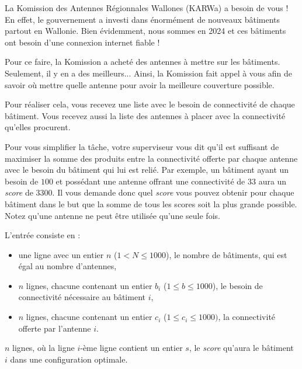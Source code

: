 \problemname{\problemyamlname}


La Komission des Antennes Régionnales Wallones (KARWa) a besoin de vous ! En effet, le gouvernement a investi dans énormément de nouveaux bâtiments partout en Wallonie. Bien évidemment, nous sommes en 2024 et ces bâtiments ont besoin d'une connexion internet fiable !

Pour ce faire, la Komission a acheté des antennes à mettre sur les bâtiments. Seulement, il y en a des meilleurs... Ainsi, la Komission fait appel à vous afin de savoir où mettre quelle antenne pour avoir la meilleure couverture possible.

Pour réaliser cela, vous recevez une liste avec le besoin de connectivité de chaque bâtiment. Vous recevez aussi la liste des antennes à placer avec la connectivité qu'elles procurent.

Pour vous simplifier la tâche, votre superviseur vous dit qu'il est suffisant de maximiser la somme des produits entre la connectivité offerte par chaque antenne avec le besoin du bâtiment qui lui est relié. Par exemple, un bâtiment ayant un besoin de $100$ et possédant une antenne offrant une connectivité de $33$ aura un \emph{score} de $3300$. Il vous demande donc quel \emph{score} vous pouvez obtenir pour chaque bâtiment dans le but que la somme de tous les scores soit la plus grande possible. Notez qu'une antenne ne peut être utilisée qu'une seule fois.

\begin{Input}
    L'entrée consiste en :
    \begin{itemize}
      \item une ligne avec un entier $n$ ($1 < N \leq 1000$), le nombre de bâtiments, qui est égal au nombre d'antennes,
      \item $n$ lignes, chacune contenant un entier $b_i$ ($1 \leq b \leq 1000$), le besoin de connectivité nécessaire au bâtiment $i$,
      \item $n$ lignes, chacune contenant un entier $c_i$ ($1 \leq c_i \leq 1000)$, la connectivité offerte par l'antenne $i$.
    \end{itemize}
\end{Input}

\begin{Output}
  $n$ lignes, où la ligne $i$-ème ligne contient un entier $s$, le \emph{score} qu'aura le bâtiment $i$ dans une configuration optimale.
\end{Output}
